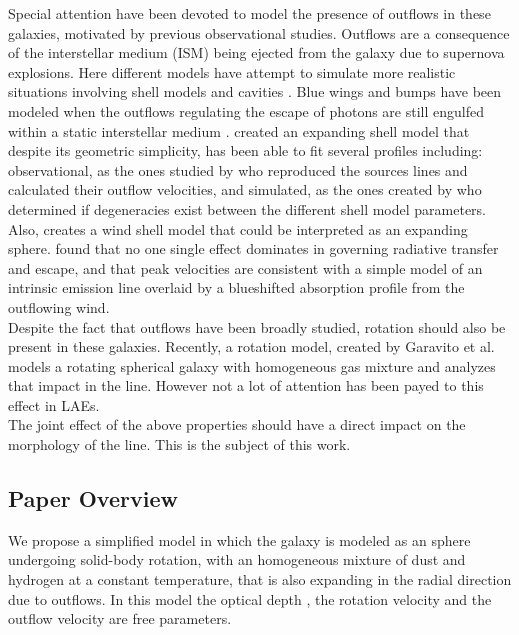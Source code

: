 \documentclass{latex/emulateapj}
\begin{document}
Special attention have been devoted to model the presence of outflows in these galaxies, motivated by previous observational studies. Outflows are a consequence of the interstellar medium (ISM) being ejected from the galaxy due to supernova explosions. Here different models have attempt to simulate more realistic situations involving shell models and cavities \citep{Behrens2014}. Blue wings and bumps have been modeled when the outflows regulating the escape of \lya photons are still engulfed within a static interstellar medium \citep{Chung2015}. \cite{Verhamme06} created an expanding shell model that despite its geometric simplicity, has been able to fit several \lya profiles including: observational, as the ones studied by \cite{Hashimoto2015} who reproduced the sources \lya lines and calculated their outflow velocities, and simulated, as the ones created by \cite{Gronke2015} who determined if degeneracies exist between the different shell model parameters. Also, \cite{Orsi12} creates a wind shell model that could be interpreted as an expanding sphere. \cite{Rivera-Thorsen2015} found that no one single effect dominates in governing \lya radiative transfer and escape, and that \lya peak velocities are consistent with a simple model of an intrinsic emission line overlaid by a blueshifted absorption profile from the outﬂowing wind.\\

Despite the fact that outflows have been broadly studied, rotation should also be present in these galaxies. Recently, a rotation model, created by Garavito et al. \cite{Garavito14} models a rotating spherical galaxy with homogeneous gas mixture and analyzes that impact in the \lya line. However not a lot of attention has been payed to this effect in LAEs.\\

The joint effect of the above properties should have a direct impact on the morphology of the \lya line. This is the subject of this work. \\

\subsection{Paper Overview}

We propose a simplified model in which the galaxy is modeled as an sphere undergoing solid-body rotation, with an homogeneous mixture of dust and hydrogen at a constant temperature, that is also expanding in the radial direction due to outflows. In this model the optical depth \tauh, the  rotation velocity \vrot and the outflow velocity \vout are free parameters. \\
\end{document}
